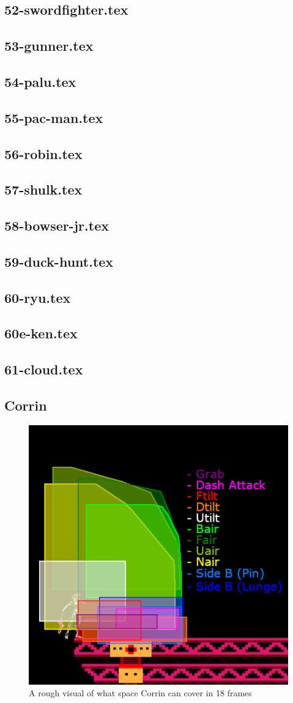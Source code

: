 \subsection{52-swordfighter.tex}
\subsection{53-gunner.tex}
\subsection{54-palu.tex}
\subsection{55-pac-man.tex}
\subsection{56-robin.tex}
\subsection{57-shulk.tex}
\subsection{58-bowser-jr.tex}
\subsection{59-duck-hunt.tex}
\subsection{60-ryu.tex}
\subsection{60e-ken.tex}
\subsection{61-cloud.tex}
\subsection{Corrin}
\begin{figure}[h]
    \centering
    \includegraphics[width=.4\textwidth]{images/threat-ranges/corrin}
    \caption{A rough visual of what space Corrin can cover in 18 frames\cite{ref:threat-range:corrin}}
\end{figure}

